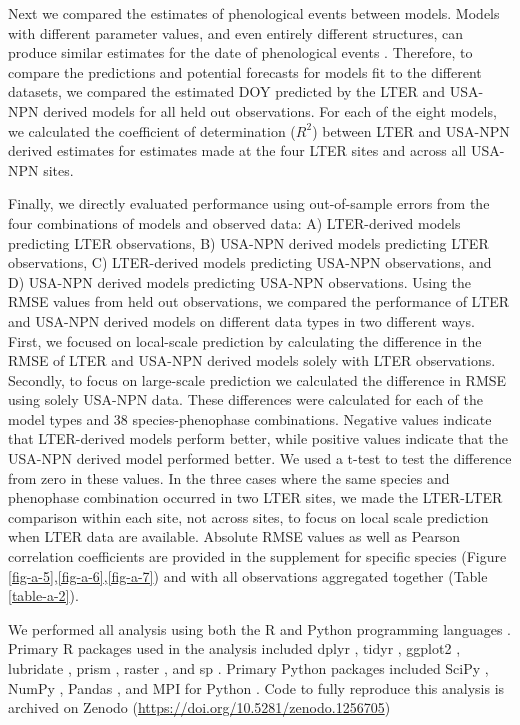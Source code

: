 Next we compared the estimates of phenological events between models. Models with different parameter values, and even entirely different structures, can produce similar estimates for the date of phenological events \citep{basler2016}. Therefore, to compare the predictions and potential forecasts for models fit to the different datasets, we compared the estimated DOY predicted by the LTER and USA-NPN derived models for all held out observations. For each of the eight models, we calculated the coefficient of determination ($R^2$) between LTER and USA-NPN derived estimates for estimates made at the four LTER sites and across all USA-NPN sites.  

Finally, we directly evaluated performance using out-of-sample errors from the four combinations of models and observed data: A) LTER-derived models predicting LTER observations, B) USA-NPN derived models predicting LTER observations, C) LTER-derived models predicting USA-NPN observations, and D) USA-NPN derived models predicting USA-NPN observations. Using the RMSE values from held out observations, we compared the performance of LTER and USA-NPN derived models on different data types in two different ways. First, we focused on local-scale prediction by calculating the difference in the RMSE of LTER and USA-NPN derived models solely with LTER observations. Secondly, to focus on large-scale prediction we calculated the difference in RMSE using solely USA-NPN data. These differences were calculated for each of the model types and 38 species-phenophase combinations. Negative values indicate that LTER-derived models perform better, while positive values indicate that the USA-NPN derived model performed better. We used a t-test to test the difference from zero in these values. In the three cases where the same species and phenophase combination occurred in two LTER sites, we made the LTER-LTER comparison within each site, not across sites, to focus on local scale prediction when LTER data are available. Absolute RMSE values as well as Pearson correlation coefficients are provided in the supplement for specific species (Figure \ref{fig-a-5},\ref{fig-a-6},\ref{fig-a-7}) and with all observations aggregated together (Table \ref{table-a-2}).

We performed all analysis using both the R and Python programming languages \citep{rcitation, python}. Primary R packages used in the analysis included dplyr \citep{dplyr}, tidyr \citep{tidyr}, ggplot2 \citep{ggplot2}, lubridate \citep{lubridate}, prism \citep{prismR}, raster \citep{rasterR}, and sp \citep{sp1}. Primary Python packages included SciPy \citep{scipy}, NumPy \citep{numpy}, Pandas \citep{pandas}, and MPI for Python \citep{mpi4py}. Code to fully reproduce this analysis is archived on Zenodo (\href{https://doi.org/10.5281/zenodo.1256705}{https://doi.org/10.5281/zenodo.1256705})

